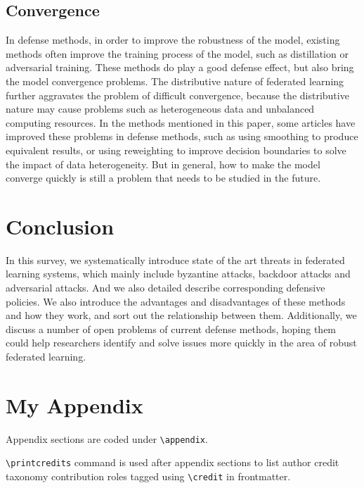 \documentclass[a4paper,fleqn]{cas-dc}
\begin{document}
    \subsection{Convergence}
    In defense methods, in order to improve the robustness
    of the model, existing methods often improve the training
    process of the model, such as distillation or adversarial
    training. These methods do play a good defense effect, but
    also bring the model convergence problems. The distributive
    nature of federated learning further aggravates the
    problem of diﬀicult convergence, because the distributive
    nature may cause problems such as heterogeneous data
    and unbalanced computing resources. In the methods
    mentioned in this paper, some articles have improved these
    problems in defense methods, such as using smoothing
    to produce equivalent results, or using reweighting to
    improve decision boundaries to solve the impact of data
    heterogeneity. But in general, how to make the model
    converge quickly is still a problem that needs to be studied
    in the future.
    \section{Conclusion}
    In this survey, we systematically introduce state of the art 
    threats in federated learning systems, which mainly
    include byzantine attacks, backdoor attacks and adversarial
    attacks. And we also detailed describe corresponding
    defensive policies. We also introduce the advantages and
    disadvantages of these methods and how they work, and
    sort out the relationship between them. Additionally, we
    discuss a number of open problems of current defense
    methods, hoping them could help researchers identify and
    solve issues more quickly in the area of robust federated
    learning.




\appendix
\section{My Appendix}
Appendix sections are coded under \verb+\appendix+.

\verb+\printcredits+ command is used after appendix sections to list
author credit taxonomy contribution roles tagged using \verb+\credit+
in frontmatter.

\printcredits

%



\end{document}

